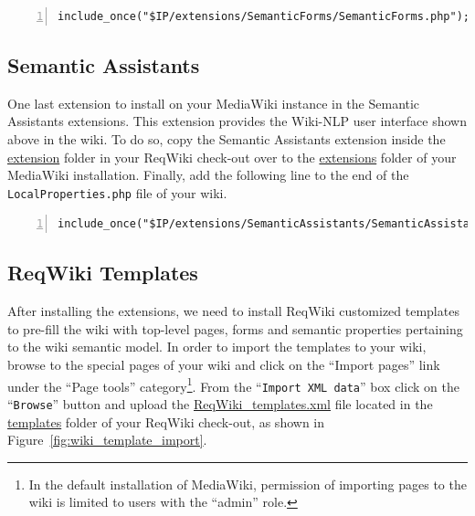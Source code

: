 \documentclass[10pt,twoside,openany,bibtotoc,liststotoc]{scrbook}
\newcommand{\sa}{Semantic Assistants\xspace}
\begin{document}
\begin{center}
\begin{lstlisting}[language=xml,numbers=left,xleftmargin=4mm,columns=flexible]
include_once("$IP/extensions/SemanticForms/SemanticForms.php");
\end{lstlisting}
\end{center}

\subsection{Semantic Assistants}
One last extension to install on your MediaWiki instance in the \sa extensions. This extension provides the Wiki-NLP user interface shown above in the wiki. To do so, copy the \sa extension inside the \url{extension} folder in your ReqWiki check-out over to the \url{extensions} folder of your MediaWiki installation. Finally, add the following line to the end of the \texttt{LocalProperties.php} file of your wiki.

\begin{center}
\begin{lstlisting}[language=xml,numbers=left,xleftmargin=4mm,columns=flexible]
include_once("$IP/extensions/SemanticAssistants/SemanticAssistants.php");
\end{lstlisting}
\end{center}

\subsection{ReqWiki Templates}
After installing the extensions, we need to install ReqWiki customized templates to pre-fill the wiki with top-level pages, forms and semantic properties pertaining to the wiki semantic model. In order to import the templates to your wiki, browse to the special pages of your wiki and click on the ``Import pages'' link under the ``Page tools'' category\footnote{In the default installation of MediaWiki, permission of importing pages to the wiki is limited to users with the ``admin'' role.}. From the ``\texttt{Import XML data}'' box click on the ``\texttt{Browse}'' button and upload the \url{ReqWiki_templates.xml} file located in the \url{templates} folder of your ReqWiki check-out, as shown in Figure~\ref{fig:wiki_template_import}.
\end{document}
